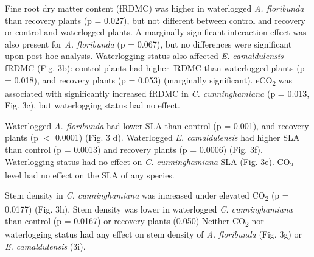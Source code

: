 \documentclass[openright,12pt,a4paper]{memoir}
\begin{document}
Fine root dry matter content (fRDMC) was higher in waterlogged \textit{A. floribunda} than recovery plants (p = 0.027), but not different between control and recovery or control and waterlogged plants. A marginally significant interaction effect was also present for \textit{A. floribunda} (p = 0.067), but no differences were significant upon post-hoc analysis. Waterlogging status also affected \textit{E. camaldulensis} fRDMC (Fig. 3b): control plants had higher fRDMC than waterlogged plants (p = 0.018), and recovery plants (p = 0.053) (marginally significant). eCO\textsubscript{2} was associated with significantly increased fRDMC in \textit{C. cunninghamiana} (p = 0.013, Fig. 3c), but waterlogging status had no effect.

Waterlogged \textit{A. floribunda} had lower SLA than control (p = 0.001), and recovery plants (p $<$ 0.0001) (Fig. 3 d). Waterlogged \textit{E. camaldulensis} had higher SLA than control (p = 0.0013) and recovery plants (p = 0.0006) (Fig. 3f). Waterlogging status had no effect on \textit{C. cunninghamiana} SLA (Fig. 3e). CO\textsubscript{2} level had no effect on the SLA of any species. 

Stem density in \textit{C. cunninghamiana} was increased under elevated CO\textsubscript{2} (p = 0.0177) (Fig. 3h). Stem density was lower in waterlogged \textit{C. cunninghamiana} than control (p = 0.0167) or recovery plants (0.050) Neither CO\textsubscript{2} nor waterlogging status had any effect on stem density of \textit{A. floribunda} (Fig. 3g) or \textit{E. camaldulensis} (3i).
\end{document}
